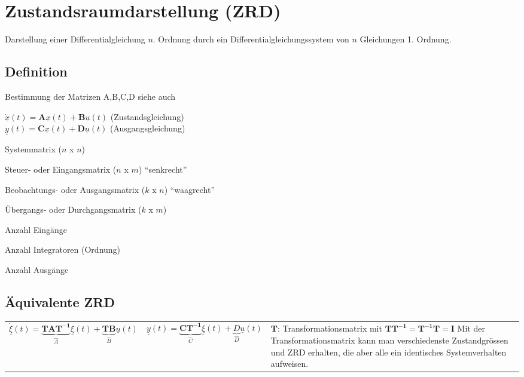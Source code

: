 \section{Zustandsraumdarstellung (ZRD) }
Darstellung einer Differentialgleichung $n$. Ordnung durch ein
Differentialgleichungssystem von $n$ Gleichungen 1. Ordnung.

\subsection{Definition }
\begin{multicols}{2}
	
	Bestimmung der Matrizen A,B,C,D siehe auch 
	
	$\dot{\underline{x}}(t) = {\boldsymbol A} \underline{x}(t) + {\boldsymbol B} \underline{u}(t)$ 
  \qquad (Zustandsgleichung) \\
	$\underline{y}(t) = {\boldsymbol C} \underline{x}(t) + {\boldsymbol D} \underline{u}(t)$ \qquad (Ausgangsgleichung)
		
	\begin{description}[noitemsep, style=multiline, leftmargin=15pt]
  		\item[A] Systemmatrix ($n$ x $n$)
  		\item[B] Steuer- oder Eingangsmatrix ($n$ x $m$) ``senkrecht''
  		\item[C] Beobachtungs- oder Ausgangsmatrix ($k$ x $n$) ``waagrecht''
  		\item[D] Übergangs- oder Durchgangsmatrix ($k$ x $m$) \\
  		\item[m] Anzahl Eingänge
  		\item[n] Anzahl Integratoren (Ordnung)
  		\item[k] Anzahl Ausgänge
	\end{description}	
\end{multicols}

\subsection{Äquivalente ZRD }
  \begin{tabular}{p{6cm}p{6cm}p{6cm}}
    \[\underline{\dot{\xi}}(t) = \underbrace{\mathbf{TAT^{-1}}}_{\hat A}\underline\xi(t) +
    \underbrace{\mathbf{TB}}_{\hat B}\underline u(t) \] &
    
    \[ \underline y(t) = \underbrace{\mathbf{CT^{-1}}}_{\hat C}\underline\xi(t) +
    \underbrace{D}_{\hat D}\underline u(t) \] &
    
    $\mathbf{T}$: Transformationsmatrix mit \newline
    $\mathbf{TT^{-1}=T^{-1}T=I}$ \newline
    Mit der Transformationsmatrix kann man verschiedenste Zustandgrössen und ZRD erhalten,
    die aber alle ein identisches Systemverhalten aufweisen.
  \end{tabular}
  
